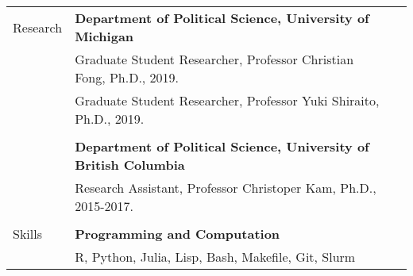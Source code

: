\documentclass[letterpaper,11pt,oneside]{article}
\begin{document}
\begin{tabular}{@{} l l l}
  \Large{Research}
                      & \textbf{Department of Political Science, University of Michigan} \\
                      & Graduate Student Researcher, Professor Christian Fong, Ph.D., 2019. \\
                      & Graduate Student Researcher, Professor Yuki Shiraito, Ph.D., 2019. \\
  \\
                      & \textbf{Department of Political Science, University of British Columbia} \\
                      & Research Assistant, Professor Christoper Kam, Ph.D., 2015-2017. \\
                      & \\

  \Large{Skills}
                      & \textbf{Programming and Computation} \\
                      & R, Python, Julia, Lisp, Bash, Makefile, Git, Slurm \\


\end{tabular}
\end{document}
